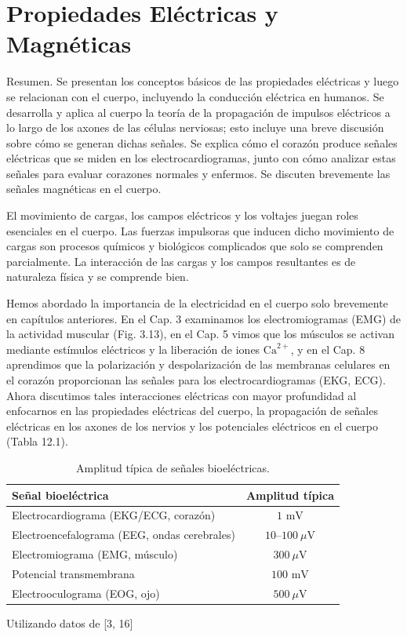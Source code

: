 \documentclass[12pt]{book}
\begin{document}
\chapter{Propiedades Eléctricas y Magnéticas}
\label{chap:12}

Resumen. Se presentan los conceptos básicos de las propiedades eléctricas y luego se relacionan con el cuerpo, incluyendo la conducción eléctrica en humanos. Se desarrolla y aplica al cuerpo la teoría de la propagación de impulsos eléctricos a lo largo de los axones de las células nerviosas; esto incluye una breve discusión sobre cómo se generan dichas señales. Se explica cómo el corazón produce señales eléctricas que se miden en los electrocardiogramas, junto con cómo analizar estas señales para evaluar corazones normales y enfermos. Se discuten brevemente las señales magnéticas en el cuerpo.

El movimiento de cargas, los campos eléctricos y los voltajes juegan roles esenciales en el cuerpo. Las fuerzas impulsoras que inducen dicho movimiento de cargas son procesos químicos y biológicos complicados que solo se comprenden parcialmente. La interacción de las cargas y los campos resultantes es de naturaleza física y se comprende bien.

Hemos abordado la importancia de la electricidad en el cuerpo solo brevemente en capítulos anteriores. En el Cap. 3 examinamos los electromiogramas (EMG) de la actividad muscular (Fig. 3.13), en el Cap. 5 vimos que los músculos se activan mediante estímulos eléctricos y la liberación de iones $\text{Ca}^{2+}$, y en el Cap. 8 aprendimos que la polarización y despolarización de las membranas celulares en el corazón proporcionan las señales para los electrocardiogramas (EKG, ECG). Ahora discutimos tales interacciones eléctricas con mayor profundidad al enfocarnos en las propiedades eléctricas del cuerpo, la propagación de señales eléctricas en los axones de los nervios y los potenciales eléctricos en el cuerpo (Tabla 12.1).

\begin{table}[htbp]
\centering
\caption{Amplitud típica de señales bioeléctricas.}
\label{tab:12.1}
\begin{tabularx}{\textwidth}{X c}
\toprule
Señal bioeléctrica & Amplitud típica \\
\midrule
Electrocardiograma (EKG/ECG, corazón) & $1\text{ mV}$ \\
Electroencefalograma (EEG, ondas cerebrales) & $10\text{--}100\ \mu\text{V}$ \\
Electromiograma (EMG, músculo) & $300\ \mu\text{V}$ \\
Potencial transmembrana & $100\text{ mV}$ \\
Electrooculograma (EOG, ojo) & $500\ \mu\text{V}$ \\
\bottomrule
\end{tabularx}
\addvspace{5pt}
\raggedright\small Utilizando datos de [3, 16]
\end{table}
\end{document}
